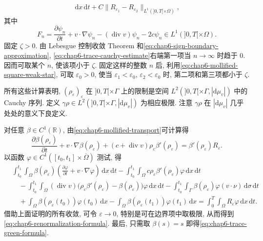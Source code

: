 \begin{sloppypar}
\begin{Proof}
\begin{itemize}
\begin{equation}
\begin{aligned}
 \,\mathrm dx\,\mathrm dt
 +C\|R_{\varepsilon_1}-R_{\varepsilon_2}\|_{L^1(]0,T[\times\Omega)},
 \end{aligned}
 \label{eq:chap6-trace-cauchy-estimate}
 \end{equation}
 其中
 \[
  F_n=\frac{\partial\psi_n}{\partial t}+v\cdot\nabla\psi_n
  -(\operatorname{div}v)\psi_n-2c\psi_n
  \in L^1(]0,T[\times\Omega).
 \]
 固定 $\zeta>0$. 由 Lebesgue 控制收敛 Theorem 和\eqref{eq:chap6-sign-boundary-approximation}, \eqref{eq:chap6-trace-cauchy-estimate}右端第一项当 $n\to\infty$ 时趋于 $0$. 因而可取某个 $n$, 使该项小于 $\zeta$. 固定这样的整数 $n$ 后, 利用\eqref{eq:chap6-mollified-square-weak-star}, 可取 $\varepsilon_0>0$, 使当 $\varepsilon_1<\varepsilon_0$, $\varepsilon_2<\varepsilon_0$ 时, 第二项和第三项都小于 $\zeta$.

 所有这些计算表明, $(\rho_\varepsilon)_\varepsilon$ 在 $]0,T[\times\Gamma$ 上的限制是空间 $L^2(]0,T[\times\Gamma,|\mathrm d\mu_v|)$ 中的 Cauchy 序列. 定义 $\gamma\rho\in L^2(]0,T[\times\Gamma,|\mathrm d\mu_v|)$ 为相应极限. 注意 $\gamma\rho$ 在 $|\mathrm d\mu_v|$ 几乎处处的意义下良定义.

 对任意 $\beta\in C^1(\mathbb R)$, 由\eqref{eq:chap6-mollified-transport}可计算得
 \[
  \frac{\partial\beta(\rho_\varepsilon)}{\partial t}
  +v\cdot\nabla\beta(\rho_\varepsilon)
  +(c+\operatorname{div}v)\rho_\varepsilon\beta'(\rho_\varepsilon)
  =\beta'(\rho_\varepsilon)R_\varepsilon.
 \]
 以函数 $\varphi\in C^1([t_0,t_1]\times\overline\Omega)$ 测试, 得
 \[
 \begin{aligned}
 &\int_{t_0}^{t_1}\int_\Omega\beta(\rho_\varepsilon)
 \left(\frac{\partial\varphi}{\partial t}+v\cdot\nabla\varphi\right)
 \,\mathrm dx\,\mathrm dt
 -\int_{t_0}^{t_1}\int_\Omega c\rho_\varepsilon\beta'(\rho_\varepsilon)\varphi
 \,\mathrm dx\,\mathrm dt\\
 &\quad-\int_{t_0}^{t_1}\int_\Omega(\operatorname{div}v)
 \bigl(\rho_\varepsilon\beta'(\rho_\varepsilon)-\beta(\rho_\varepsilon)\bigr)\varphi
 \,\mathrm dx\,\mathrm dt
 -\int_{t_0}^{t_1}\int_\Gamma\beta(\rho_\varepsilon)\varphi(v\cdot\nu)
 \,\mathrm d\sigma\,\mathrm dt\\
 &\quad+\int_\Omega\beta(\rho_\varepsilon(t_0))\varphi(t_0)\,\mathrm dx
 -\int_\Omega\beta(\rho_\varepsilon(t_1))\varphi(t_1)\,\mathrm dx
 =\int_0^T\int_\Omega R_\varepsilon\varphi\,\mathrm dx\,\mathrm dt.
 \end{aligned}
 \]
 借助上面证明的所有收敛, 可令 $\varepsilon\to0$, 特别是可在边界项中取极限, 从而得到\eqref{eq:chap6-renormalization-formula}. 最后, 只需取 $\beta(s)=s$ 即得\eqref{eq:chap6-trace-green-formula}.


\end{itemize}
\end{Proof}
\end{sloppypar}
